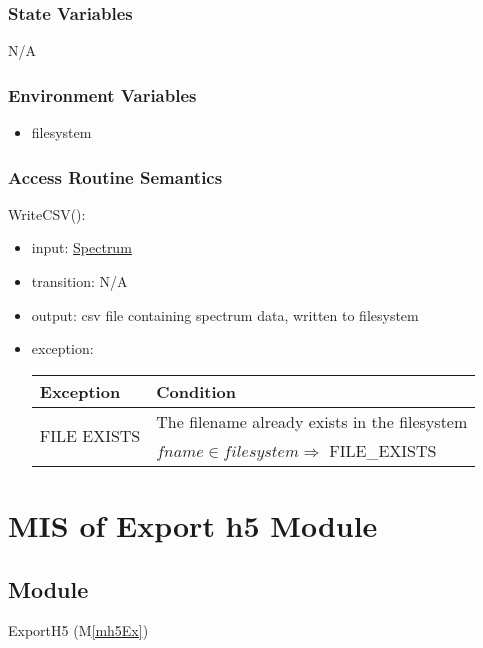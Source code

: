 \documentclass[12pt, titlepage]{article}
\newcommand{\mref}[1]{M\ref{#1}}
\begin{document}
\subsubsection{State Variables}
N/A

\subsubsection{Environment Variables}
\begin{itemize}
    \item filesystem
\end{itemize}

\subsubsection{Access Routine Semantics}

\noindent WriteCSV():
\begin{itemize}
    \item input: \hyperref[Mod:Spectrum]{Spectrum}
    \item transition: N/A
    \item output: csv file containing spectrum data, written to filesystem
    \item exception:
    \begin{center}
        \begin{tabular}{p{3cm} p{12cm}}
            \toprule[0.15em]
            \textbf{Exception} & \textbf{Condition}\\
            \midrule[0.1em]
            \multirow{2}{0.25\textwidth}{FILE EXISTS} & The filename already
            exists in the filesystem\\ 
            & $fname \in filesystem \Rightarrow$ FILE\_EXISTS\\ 
            \bottomrule[0.15em]
        \end{tabular}
    \end{center}
\end{itemize}

\section{MIS of Export h5 Module} \label{Mod:ExportH5}

\subsection{Module}

ExportH5 (\mref{mh5Ex})
\end{document}
